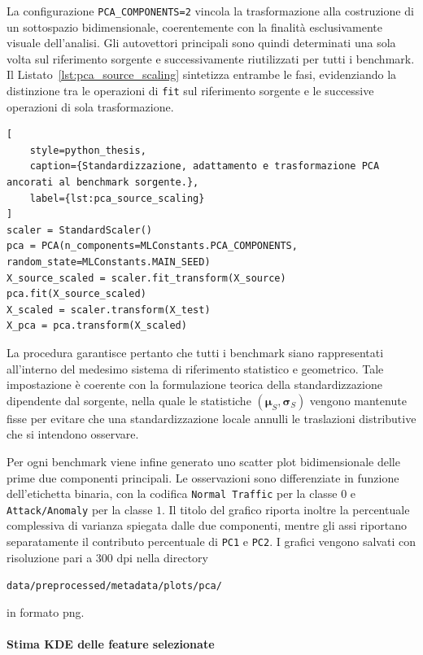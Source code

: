 La configurazione \texttt{PCA\_COMPONENTS=2} vincola la trasformazione alla costruzione di un sottospazio bidimensionale, coerentemente con la finalità esclusivamente visuale dell'analisi. 
Gli autovettori principali sono quindi determinati una sola volta sul riferimento sorgente e successivamente riutilizzati per tutti i benchmark. 
Il Listato~\ref{lst:pca_source_scaling} sintetizza entrambe le fasi, evidenziando la distinzione tra le operazioni di \texttt{fit} sul riferimento sorgente e le successive operazioni di sola trasformazione.

\begin{lstlisting}[
    style=python_thesis,
    caption={Standardizzazione, adattamento e trasformazione PCA ancorati al benchmark sorgente.},
    label={lst:pca_source_scaling}
]
scaler = StandardScaler()
pca = PCA(n_components=MLConstants.PCA_COMPONENTS, random_state=MLConstants.MAIN_SEED)
X_source_scaled = scaler.fit_transform(X_source)
pca.fit(X_source_scaled)
X_scaled = scaler.transform(X_test)
X_pca = pca.transform(X_scaled)
\end{lstlisting}

La procedura garantisce pertanto che tutti i benchmark siano rappresentati all'interno del medesimo sistema di riferimento statistico e geometrico. 
Tale impostazione è coerente con la formulazione teorica della standardizzazione dipendente dal sorgente, nella quale le statistiche $(\boldsymbol{\mu}_S,\boldsymbol{\sigma}_S)$ vengono mantenute fisse per evitare che una standardizzazione locale annulli le traslazioni distributive che si intendono osservare.

Per ogni benchmark viene infine generato uno scatter plot bidimensionale delle prime due componenti principali. 
Le osservazioni sono differenziate in funzione dell'etichetta binaria, con la codifica \texttt{Normal Traffic} per la classe $0$ e \texttt{Attack/Anomaly} per la classe $1$. 
Il titolo del grafico riporta inoltre la percentuale complessiva di varianza spiegata dalle due componenti, mentre gli assi riportano separatamente il contributo percentuale di \texttt{PC1} e \texttt{PC2}. 
I grafici vengono salvati con risoluzione pari a $300$ dpi nella directory 
\begin{center}
    \texttt{data/preprocessed/metadata/plots/pca/}
\end{center}
in formato png.

\paragraph{Stima KDE delle feature selezionate}

